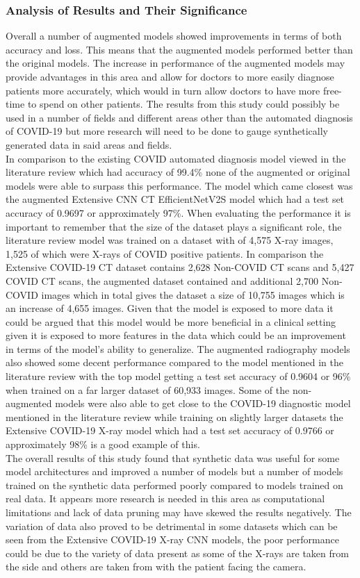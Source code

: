 \subsubsection{Analysis of Results and Their Significance}
Overall a number of augmented models showed improvements in terms of both accuracy and loss.  This means that the augmented models performed better than the original models.  The increase in performance of the augmented models may provide advantages in this area and allow for doctors to more easily diagnose patients more accurately, which would in turn allow doctors to have more free-time to spend on other patients.  The results from this study could possibly be used in a number of fields and different areas other than the automated diagnosis of COVID-19 but more research will need to be done to gauge synthetically generated data in said areas and fields. 
\\
In comparison to the existing COVID automated diagnosis model viewed in the literature review which had accuracy of 99.4\%  none of the augmented or original models were able to surpass this performance.  The model which came closest was the augmented Extensive CNN CT EfficientNetV2S model which had a test set accuracy of 0.9697 or approximately 97\%.  When evaluating the performance it is important to remember that the size of the dataset plays a significant role, the literature review model was trained on a dataset with of 4,575 X-ray images, 1,525 of which were X-rays of COVID positive patients.  In comparison the Extensive COVID-19 CT dataset contains 2,628 Non-COVID CT scans and 5,427 COVID CT scans, the augmented dataset contained and additional 2,700 Non-COVID images which in total gives the dataset a size of 10,755 images which is an increase of 4,655 images.  Given that the model is exposed to more data it could be argued that this model would be more beneficial in a clinical setting given it is exposed to more features in the data which could be an improvement in terms of the model's ability to generalize.  The augmented radiography models also showed some decent performance compared to the model mentioned in the literature review with the top model getting a test set accuracy of 0.9604 or 96\% when trained on a far larger dataset of 60,933 images.   Some of the non-augmented models were also able to get close to the COVID-19 diagnostic model mentioned in the literature review while training on slightly larger datasets the Extensive COVID-19 X-ray model which had a test set accuracy of 0.9766 or approximately 98\% is a good example of this.
\\
The overall results of this study found that synthetic data was useful for some model architectures and improved a number of models but a number of models trained on the synthetic data performed poorly compared to models trained on real data.  It appears more research is needed in this area as computational limitations and lack of data pruning may have skewed the results negatively.  The variation of data also proved to be detrimental in some datasets which can be seen from the Extensive COVID-19 X-ray CNN models, the poor performance could be due to the variety of data present as some of the X-rays are taken from the side and others are taken from with the patient facing the camera.
